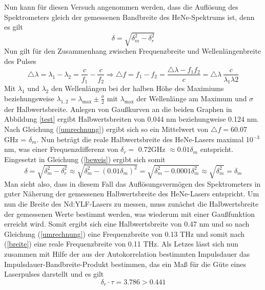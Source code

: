 Nun kann für diesen Versuch angenommen werden, dass die Auflösung des Spektrometers gleich der gemessenen Bandbreite des HeNe-Spektrums ist, denn es gilt
\begin{equation}
\delta=\sqrt{\delta_m^2-\delta_r^2}
\label{beweis}
\end{equation}
Nun gilt für den Zusammenhang zwischen Frequenzbreite und Wellenlängenbreite des Pulses
\begin{equation}
\triangle\lambda=\lambda_1-\lambda_2=\frac{c}{f_1}-\frac{c}{f_2}\Rightarrow \triangle f=f_1-f_2=\frac{\triangle\lambda-f_1f_2}{c}=\triangle\lambda\:\frac{c}{\lambda_1\lambda2}
\label{umrechnung}
\end{equation}
Mit $\lambda_1$ und $\lambda_2$ den Wellenlängen bei der halben Höhe des Maximiums beziehungsweise $\lambda_{1,2}=\lambda_{\text{max}}\pm\frac{\sigma}{2}$ mit $\lambda_{\text{max}}$ der Wellenlänge am Maximum und $\sigma$ der Halbwertsbreite. Anlegen von Gaußkurven an die beiden Graphen in Abbildung \ref{test} ergibt Halbwertsbreiten von 0.044 nm beziehungweise 0.124 nm. Nach Gleichung (\ref{umrechnung}) ergibt sich so ein Mittelwert von \newline
$\triangle f=$60.07 GHz = $\delta_m$. Nun beträgt die reale Halbwertsbreite des HeNe-Lasers maximal 10$^{-3}$nm, was einer Frequenzdifferenz von $\delta_r=$ 0.72GHz $\approx0.01\delta_m$ entspricht. Eingesetzt in Gleichung (\ref{beweis}) ergibt sich somit
\begin{equation*}
\delta=\sqrt{\delta_m^2-\delta_r^2}\approx\sqrt{\delta_m^2-(0.01\delta_m)^2}=\sqrt{\delta_m^2-0.0001\delta_m^2}\approx\sqrt{\delta_m^2}=\delta_m
\end{equation*}
Man sieht also, dass in diesem Fall das Auflösungsvermögen des Spektrometers in guter Näherung der gemessenen Halbwertsbreite des HeNe-Lasers entspricht. Um nun die Breite des Nd:YLF-Lasers zu messen, muss zunächst die Halbwertsbreite der gemessenen Werte bestimmt werden, was wiederum mit einer Gaußfunktion erreicht wird. Somit ergibt sich eine Halbwertsbreite von 0.47 nm und so nach Gleichung (\ref{umrechnung}) eine Frequenzbreite von 0.13 THz und somit nach (\ref{breite}) eine reale Frequenzbreite von 0.11 THz.\newline
Als Letzes lässt sich nun zusammen mit Hilfe der aus der Autokorrelation bestimmten Impulsdauer das Impulsdauer-Bandbreite-Produkt bestimmen, das ein Maß für die Güte eines Laserpulses darstellt und es gilt
\begin{equation}
\delta_r\cdot\tau=3.786> 0.441
\label{impulsbandbreite}
\end{equation}
